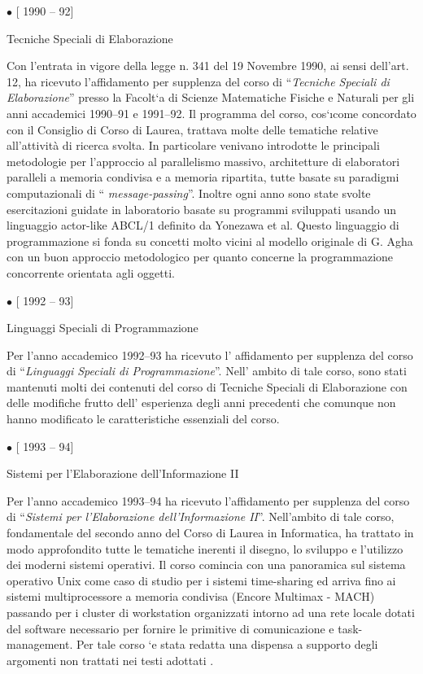 \documentclass[11pt]{article}
\newlength{\posii}
\newlength{\posiibox}
\newlength{\boxsize}
\begin{document}
\begin{description}
\item \parbox[t]{\posiibox} 
{\bf \raggedright $ \bullet $ [ 1990 -- 92] \par
\medskip
Tecniche Speciali di Elaborazione}
\hfill \parbox[t]{\boxsize} {

Con l'entrata in vigore della legge n. 341 del 19 Novembre 1990, ai
sensi dell'art. 12, ha ricevuto l'affidamento per supplenza del corso
di ``{\sl Tecniche Speciali di Elaborazione}'' presso la Facolt\a`a di
Scienze Matematiche Fisiche e Naturali per gli anni accademici
1990--91 e 1991--92. Il programma del corso, cos\a`\i come concordato
con il Consiglio di Corso di Laurea, trattava molte delle tematiche
relative all'attivit\`a di ricerca svolta.  In particolare venivano
introdotte le principali metodologie per l'approccio al parallelismo
massivo, architetture di elaboratori paralleli a memoria condivisa e a
memoria ripartita, tutte basate su paradigmi computazionali di ``{\sl
message-passing}''. Inoltre ogni anno sono state svolte esercitazioni
guidate in laboratorio basate su programmi sviluppati usando un
linguaggio actor-like ABCL/1 definito da Yonezawa et al.  Questo
linguaggio di programmazione si fonda su concetti molto vicini al
modello originale di G. Agha con un buon approccio metodologico per
quanto concerne la programmazione concorrente orientata agli oggetti.}


\item \parbox[t]{\posiibox} 
{\bf \raggedright $ \bullet $ [ 1992 -- 93] \par
\medskip
Linguaggi Speciali di Programmazione}
\hfill \parbox[t]{\boxsize} {

Per l'anno accademico 1992--93 ha ricevuto l' affidamento per
supplenza del corso di ``{\sl Linguaggi Speciali di
Programmazione}''. Nell' ambito di tale corso, sono stati mantenuti
molti dei contenuti del corso di Tecniche Speciali di Elaborazione con
delle modifiche frutto dell' esperienza degli anni precedenti che
comunque non hanno modificato le caratteristiche essenziali del
corso.}

\item \parbox[t]{\posiibox} 
{\bf \raggedright $ \bullet $ [ 1993 -- 94] \par
\medskip
Sistemi per l'Elaborazione dell'Informazione II}
\hfill \parbox[t]{\boxsize} {

Per l'anno accademico 1993--94 ha ricevuto l'affidamento per supplenza
del corso di ``{\sl Sistemi per l'Elaborazione dell'Informazione
II}''. Nell'ambito di tale corso, fondamentale del secondo anno del
Corso di Laurea in Informatica, ha trattato in modo approfondito tutte
le tematiche inerenti il disegno, lo sviluppo e l'utilizzo dei moderni
sistemi operativi. Il corso comincia con una panoramica sul sistema
operativo Unix come caso di studio per i sistemi time-sharing ed
arriva fino ai sistemi multiprocessore a memoria condivisa (Encore
Multimax - MACH) passando per i cluster di workstation organizzati
intorno ad una rete locale dotati del software necessario per fornire
le primitive di comunicazione e task-management. Per tale corso \a`e
stata redatta una dispensa a supporto degli argomenti non trattati nei
testi adottati \cite{sistemiII}.}


\end{description}
\end{document}
